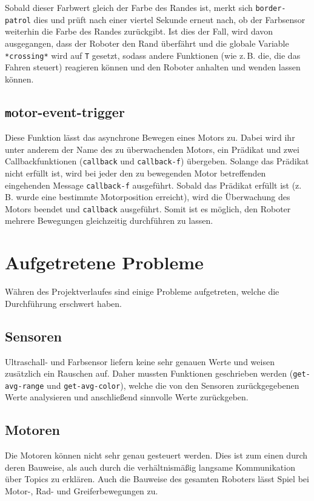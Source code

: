 \documentclass{fetch-my-doc}
\begin{document}
      Sobald dieser Farbwert gleich der Farbe des Randes ist, merkt sich \verb+border-patrol+ dies und prüft nach einer viertel Sekunde erneut nach, ob der Farbsensor weiterhin die Farbe des Randes zurückgibt. Ist dies der Fall, wird davon ausgegangen, dass der Roboter den Rand überfährt und die globale Variable \verb+*crossing*+ wird auf \verb+T+ gesetzt, sodass andere Funktionen (wie z.\,B. die, die das Fahren steuert) reagieren können und den Roboter anhalten und wenden lassen können.
      
    \subsection{\texttt motor-event-trigger}
      Diese Funktion lässt das asynchrone Bewegen eines Motors zu. Dabei wird ihr unter anderem der Name des zu überwachenden Motors, ein Prädikat und zwei Callbackfunktionen (\verb+callback+ und \verb+callback-f+) übergeben. Solange das Prädikat nicht erfüllt ist, wird bei jeder den zu bewegenden Motor betreffenden eingehenden Message \verb+callback-f+ ausgeführt. Sobald das Prädikat erfüllt ist (z.\,B. wurde eine bestimmte Motorposition erreicht), wird die Überwachung des Motors beendet und \verb+callback+ ausgeführt. Somit ist es möglich, den Roboter mehrere Bewegungen gleichzeitig durchführen zu lassen.
    
  \section{Aufgetretene Probleme}
    Währen des Projektverlaufes sind einige Probleme aufgetreten, welche die Durchführung erschwert haben.
    
    \subsection{Sensoren}
      Ultraschall- und Farbsensor liefern keine sehr genauen Werte und weisen zusätzlich ein Rauschen auf. Daher mussten Funktionen geschrieben werden (\verb+get-avg-range+ und \verb+get-avg-color+), welche die von den Sensoren zurückgegebenen Werte analysieren und anschließend sinnvolle Werte zurückgeben.
    
    \subsection{Motoren}
      Die Motoren können nicht sehr genau gesteuert werden. Dies ist zum einen durch deren Bauweise, als auch durch die verhältnismäßig langsame Kommunikation über Topics zu erklären. Auch die Bauweise des gesamten Roboters lässt Spiel bei Motor-, Rad- und Greiferbewegungen zu.
      
\end{document}
